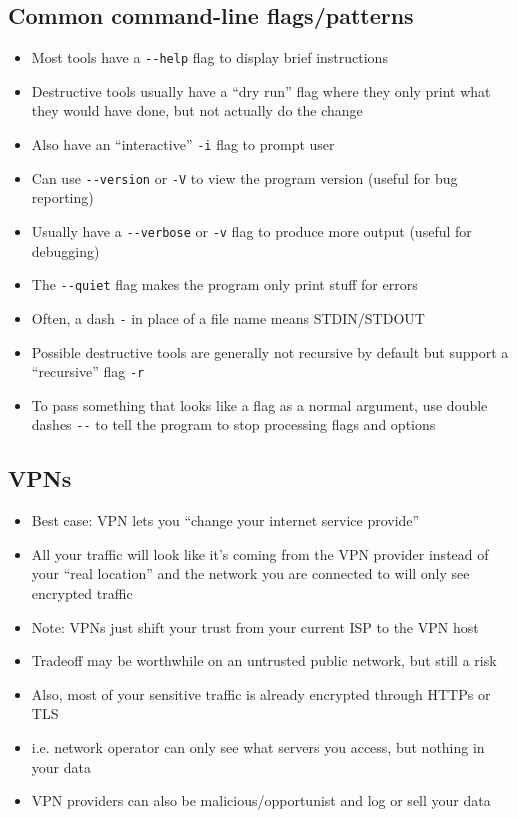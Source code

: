 \documentclass[letterpaper,12pt]{article}
\begin{document}
\subsection{Common command-line flags/patterns}
\begin{itemize}
 \item Most tools have a \lstinline{--help} flag to display brief instructions
 \item Destructive tools usually have a ``dry run'' flag where they only print what they would have done, but not actually do the change
 \item Also have an ``interactive'' \lstinline{-i} flag to prompt user
 \item Can use \lstinline{--version} or \lstinline{-V} to view the program version (useful for bug reporting)
 \item Usually have a \lstinline{--verbose} or \lstinline{-v} flag to produce more output (useful for debugging)
 \item The \lstinline{--quiet} flag makes the program only print stuff for errors
 \item Often, a dash \lstinline{-} in place of a file name means STDIN/STDOUT
 \item Possible destructive tools are generally not recursive by default but support a ``recursive'' flag \lstinline{-r}
 \item To pass something that looks like a flag as a normal argument, use double dashes \lstinline{--} to tell the program to stop processing flags and options
\end{itemize}

\subsection{VPNs}
\begin{itemize}
 \item Best case: VPN lets you ``change your internet service provide''
 \item All your traffic will look like it's coming from the VPN provider instead of your ``real location'' and the network you are connected to will only see encrypted traffic
 \item Note: VPNs just shift your trust from your current ISP to the VPN host
 \item Tradeoff may be worthwhile on an untrusted public network, but still a risk
 \item Also, most of your sensitive traffic is already encrypted through HTTPs or TLS
 \item i.e. network operator can only see what servers you access, but nothing in your data
 \item VPN providers can also be malicious/opportunist and log or sell your data
\end{itemize}
\end{document}
